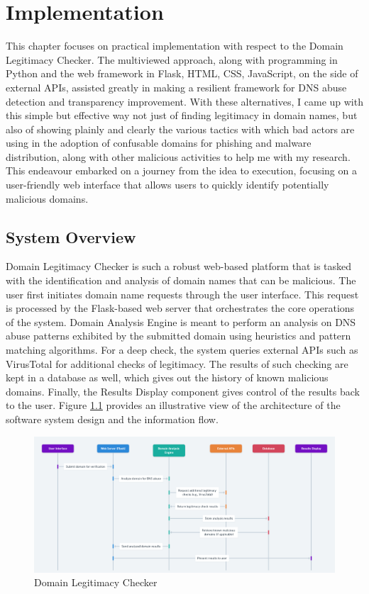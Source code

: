 \chapter{Implementation}



This chapter focuses on practical implementation with respect to the Domain Legitimacy Checker. The multiviewed approach, along with programming in Python and the web framework in Flask, HTML, CSS, JavaScript, on the side of external APIs, assisted greatly in making a resilient framework for DNS abuse detection and transparency improvement. With these alternatives, I came up with this simple but effective way not just of finding legitimacy in domain names, but also of showing plainly and clearly the various tactics with which bad actors are using in the adoption of confusable domains for phishing and malware distribution, along with other malicious activities to help me with my research. This endeavour embarked on a journey from the idea to execution, focusing on a user-friendly web interface that allows users to quickly identify potentially malicious domains. 

\section{System Overview}

Domain Legitimacy Checker is such a robust web-based platform that is tasked with the identification and analysis of domain names that can be malicious. The user first initiates domain name requests through the user interface. This request is processed by the Flask-based web server that orchestrates the core operations of the system. Domain Analysis Engine is meant to perform an analysis on DNS abuse patterns exhibited by the submitted domain using heuristics and pattern matching algorithms. For a deep check, the system queries external APIs such as VirusTotal for additional checks of legitimacy. The results of such checking are kept in a database as well, which gives out the history of known malicious domains. Finally, the Results Display component gives control of the results back to the user. Figure \ref{fig:figfig} provides an illustrative view of the architecture of the software system design and the information flow.


\begin{figure}[H]
\captionsetup{font= footnotesize}
    \centering
    \includegraphics[width=1\linewidth]{project/DNS Abuse Transparency System.png}
    \caption{Domain Legitimacy Checker}
    \label{fig:figfig}
\end{figure}

